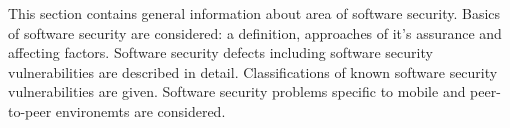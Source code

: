 %
This section contains general information about area of software security. 
%
Basics of software security are considered: a definition, approaches of it's assurance and affecting factors. 
%
Software security defects including software security vulnerabilities are described in detail. 
%
Classifications of known software security vulnerabilities are given. 
%
Software security problems specific to mobile and peer-to-peer environemts are considered. 